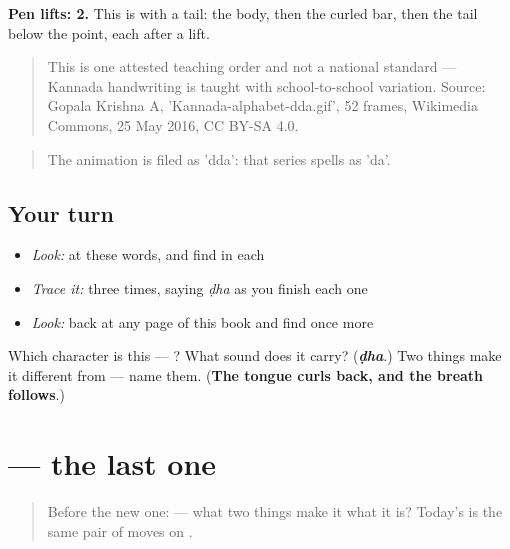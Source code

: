 \textbf{Pen lifts: 2.} This is  with a tail: the body, then the curled bar, then the tail below the point, each after a lift.

\begin{quote}
This is one attested teaching order and not a national standard — Kannada handwriting is taught with school-to-school variation. Source: Gopala Krishna A, 'Kannada-alphabet-dda.gif', 52 frames, Wikimedia Commons, 25 May 2016, CC BY-SA 4.0.
\end{quote}

\begin{quote}
The animation is filed as 'dda': that series spells  as 'da'.
\end{quote}

\subsection*{Your turn}
\begin{itemize}
\raggedright
  \item \emph{Look:} at these words, and find  in each
\end{itemize}

\begin{quote}
\end{quote}

\begin{itemize}
\raggedright
  \item \emph{Trace it:}  three times, saying \emph{ḍha} as you finish each one
  \item \emph{Look:} back at any page of this book and find  once more
\end{itemize}

\begin{tcolorbox}[breakable,colback=teal!4,colframe=teal!35!black,title={Before you move on}]
Which character is this — ? What sound does it carry? (\emph{\textbf{ḍha}}.) Two things make it different from  — name them. (\textbf{The tongue curls back, and the breath follows}.)
\end{tcolorbox}
\section[\texorpdfstring{\kn{ಠ} (ṭha)}{ಠ (ṭha)}]{ — the last one}

\label{lesson:KA-S173-letter-ttha}



\begin{quote}
Before the new one:  — what two things make it what it is? Today's is the same pair of moves on .
\end{quote}

